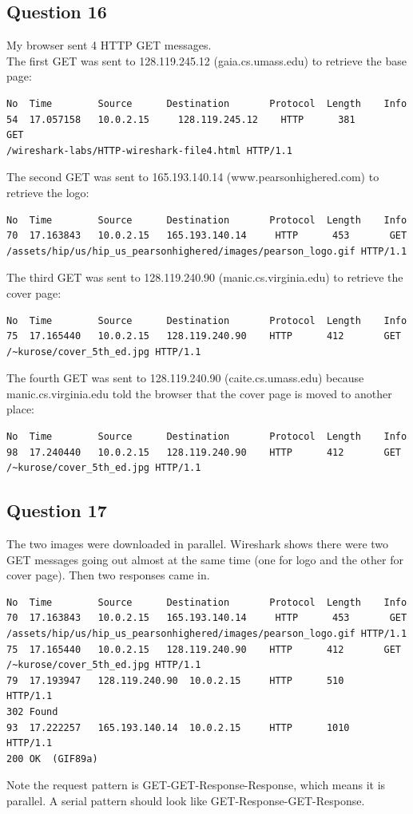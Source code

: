 \documentclass[titlepage, paper=a4, fontsize=11pt]{scrartcl} %
\numberwithin{equation}{section} %
\numberwithin{figure}{section} %
\numberwithin{table}{section} %
\begin{document}
\subsection*{Question 16}
My browser sent 4 HTTP GET messages. \\
The first GET was sent to 128.119.245.12
(gaia.cs.umass.edu) to retrieve the base page:
\begin{verbatim}
No  Time        Source      Destination       Protocol  Length    Info
54  17.057158   10.0.2.15	  128.119.245.12    HTTP      381       GET
/wireshark-labs/HTTP-wireshark-file4.html HTTP/1.1
\end{verbatim}
The second GET was sent to 165.193.140.14 (www.pearsonhighered.com) to retrieve the logo:
\begin{verbatim}
No  Time        Source      Destination       Protocol  Length    Info
70  17.163843   10.0.2.15   165.193.140.14	   HTTP      453       GET
/assets/hip/us/hip_us_pearsonhighered/images/pearson_logo.gif HTTP/1.1 
\end{verbatim}
The third GET was sent to 128.119.240.90 (manic.cs.virginia.edu) to retrieve the cover page:
\begin{verbatim}
No  Time        Source      Destination       Protocol  Length    Info
75  17.165440   10.0.2.15   128.119.240.90    HTTP      412       GET
/~kurose/cover_5th_ed.jpg HTTP/1.1 
\end{verbatim}
The fourth GET was sent to 128.119.240.90 (caite.cs.umass.edu) because manic.cs.virginia.edu told the browser that the cover page is moved to another place:
\begin{verbatim}
No  Time        Source      Destination       Protocol  Length    Info
98  17.240440   10.0.2.15   128.119.240.90    HTTP      412       GET
/~kurose/cover_5th_ed.jpg HTTP/1.1 
\end{verbatim}

\subsection*{Question 17}
The two images were downloaded in parallel. Wireshark shows there were two GET messages going out almost at the same time (one for logo and the other for cover page). Then two responses came in.
\begin{verbatim}
No  Time        Source      Destination       Protocol  Length    Info
70  17.163843   10.0.2.15   165.193.140.14	   HTTP      453       GET
/assets/hip/us/hip_us_pearsonhighered/images/pearson_logo.gif HTTP/1.1
75  17.165440   10.0.2.15   128.119.240.90    HTTP      412       GET
/~kurose/cover_5th_ed.jpg HTTP/1.1
79  17.193947   128.119.240.90  10.0.2.15     HTTP      510       HTTP/1.1
302 Found
93  17.222257   165.193.140.14  10.0.2.15     HTTP      1010      HTTP/1.1
200 OK  (GIF89a)
\end{verbatim}
Note the request pattern is GET-GET-Response-Response, which means it is parallel. A serial pattern should look like GET-Response-GET-Response. \\
\end{document}
